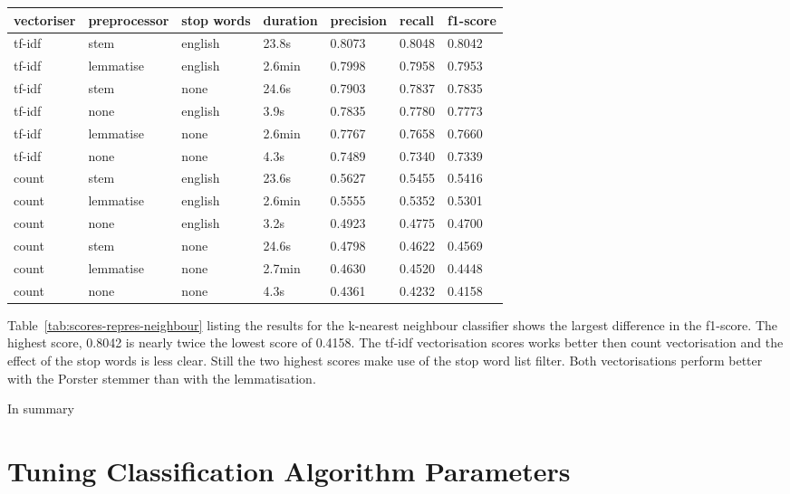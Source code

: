 \documentclass[11pt]{article}
\begin{document}
\begin{table*}[h]\footnotesize
\centering
\label{tab:scores-repres-neighbour}
\begin{tabular}{ l l l l l l l }
vectoriser & preprocessor & stop words & duration & precision & recall & f1-score \\
\hline
tf-idf & stem & english & 23.8s & 0.8073 & 0.8048 & 0.8042 \\
tf-idf & lemmatise & english & 2.6min & 0.7998 & 0.7958 & 0.7953 \\
tf-idf & stem & none & 24.6s & 0.7903 & 0.7837 & 0.7835 \\
tf-idf & none & english & 3.9s & 0.7835 & 0.7780 & 0.7773  \\
tf-idf & lemmatise & none & 2.6min & 0.7767 & 0.7658 & 0.7660 \\
tf-idf & none & none & 4.3s & 0.7489 & 0.7340 & 0.7339 \\
count & stem & english & 23.6s & 0.5627 & 0.5455 & 0.5416 \\
count & lemmatise & english & 2.6min & 0.5555 & 0.5352 & 0.5301 \\
count & none & english & 3.2s & 0.4923 & 0.4775 & 0.4700 \\
count & stem & none &  24.6s & 0.4798 & 0.4622 & 0.4569 \\
count & lemmatise & none & 2.7min & 0.4630 & 0.4520 & 0.4448 \\
count & none & none & 4.3s & 0.4361 & 0.4232 & 0.4158 \\
\end{tabular}
\caption{scores for different representations and the k-nearest neighbour classifier sorted by f1-score}
\end{table*}

Table~\ref{tab:scores-repres-neighbour} listing the results for the k-nearest neighbour classifier shows the largest difference in the f1-score. The highest score, 0.8042 is nearly twice the lowest score of 0.4158. The tf-idf vectorisation scores works better then count vectorisation and the effect of the stop words is less clear. Still the two highest scores make use of the stop word list filter. Both vectorisations perform better with the Porster stemmer than with the lemmatisation.

In summary

\section{Tuning Classification Algorithm Parameters}
\end{document}
